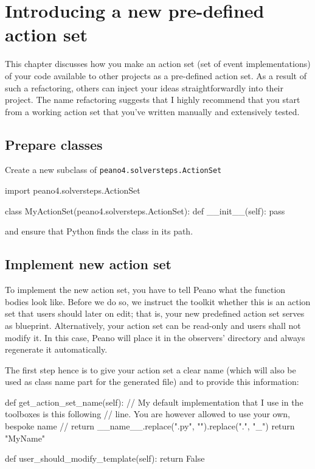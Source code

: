 \chapter{Introducing a new pre-defined action set}
\label{section:new-action-set}

This chapter discusses how you make an action set (set of event implementations)
of your code available to other projects as a pre-defined action set.
As a result of such a refactoring, others can inject your ideas
straightforwardly into their project.
The name refactoring suggests that I highly recommend that you start from a
working action set that you've written manually and extensively tested.

\section{Prepare classes}

Create a new subclass of \texttt{peano4.solversteps.ActionSet}

\begin{code}
import peano4.solversteps.ActionSet

class MyActionSet(peano4.solversteps.ActionSet):
  def __init__(self):
    pass
\end{code}

\noindent
and ensure that Python finds the class in its path.


\section{Implement new action set}

To implement the new action set, you have to tell Peano what the function bodies
look like.
Before we do so, we instruct the toolkit whether this is an action set that
users should later on edit; 
that is, your new predefined action set serves as blueprint.
Alternatively, your action set can be read-only and users shall not modify it.
In this case, Peano will place it in the observers' directory and always
regenerate it automatically.


The first step hence is to give your action set a clear name (which will also be
used as class name part for the generated file) and to provide this information:


\begin{code}
  def get_action_set_name(self):
    // My default implementation that I use in the toolboxes is this following
    // line. You are however allowed to use your own, bespoke name
    // return __name__.replace(".py", "").replace(".", "_")
    return "MyName"

  def user_should_modify_template(self):
    return False
\end{code}


